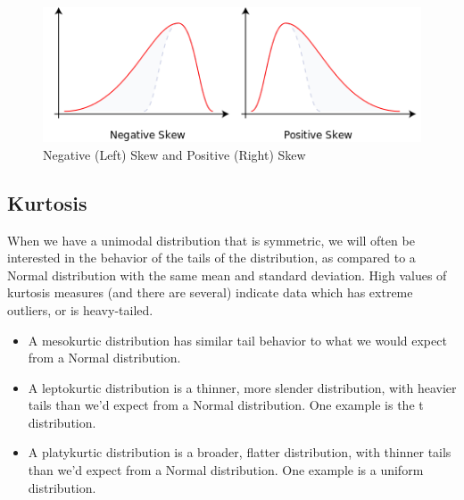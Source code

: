 \documentclass[
]{book}
\providecommand{\tightlist}{%
  \setlength{\itemsep}{0pt}\setlength{\parskip}{0pt}}
\begin{document}
\begin{figure}
\includegraphics[width=0.9\linewidth]{figures/negandposskew} \caption{Negative (Left) Skew and Positive (Right) Skew}\label{fig:negandposskew-fig}
\end{figure}

\hypertarget{kurtosis}{%
\subsection{Kurtosis}\label{kurtosis}}

When we have a unimodal distribution that is symmetric, we will often be interested in the behavior of the tails of the distribution, as compared to a Normal distribution with the same mean and standard deviation. High values of kurtosis measures (and there are several) indicate data which has extreme outliers, or is heavy-tailed.

\begin{itemize}
\tightlist
\item
  A mesokurtic distribution has similar tail behavior to what we would expect from a Normal distribution.
\item
  A leptokurtic distribution is a thinner, more slender distribution, with heavier tails than we'd expect from a Normal distribution. One example is the t distribution.
\item
  A platykurtic distribution is a broader, flatter distribution, with thinner tails than we'd expect from a Normal distribution. One example is a uniform distribution.
\end{itemize}
\end{document}

